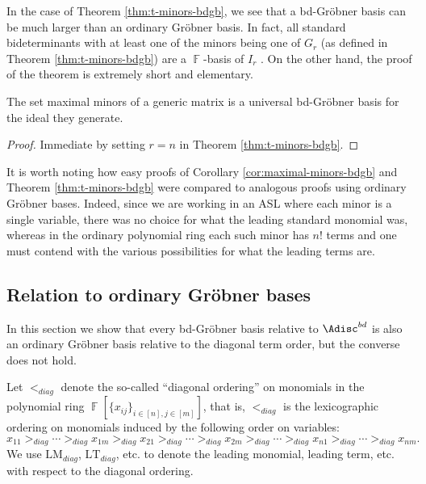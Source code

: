 \documentclass[11pt,reqno]{amsart}
\DeclareMathOperator{\F}{\mathbb{F}}
\newcommand{\gb}{Gr\"{o}bner }
\newcommand{\lt}{\text{LT}}
\newcommand{\lm}{\text{LM}}
\theoremstyle{definition}
\numberwithin{equation}{section}
\begin{document}
\begin{remark}
In the case of Theorem \ref{thm:t-minors-bdgb}, we see that a bd-\gb basis can be much larger than an ordinary \gb basis. In fact, all standard bideterminants with at least one of the minors being one of $G_{r}$ (as defined in Theorem \ref{thm:t-minors-bdgb}) are a $\F$-basis of $I_r$ \cite[Corollary 3.4.2]{bruns2022determinants}. On the other hand, the proof of the theorem is extremely short and elementary.
\end{remark}

\begin{corollary}[store=thmmaximalminorsbdgb,note={of Theorem \ref{thm:t-minors-bdgb}}]
\label{cor:maximal-minors-bdgb}
The set maximal minors of a generic matrix is a universal bd-Gröbner basis for the ideal they generate.
\end{corollary}

\begin{proof}
Immediate by setting $r = n$ in Theorem \ref{thm:t-minors-bdgb}.
\end{proof}

\begin{remark}
It is worth noting how easy proofs of Corollary \ref{cor:maximal-minors-bdgb} and Theorem \ref{thm:t-minors-bdgb} were compared to analogous proofs using ordinary Gröbner bases. Indeed, since we are working in an ASL where each minor is a single variable, there was no choice for what the leading standard monomial was, whereas in the ordinary polynomial ring each such minor has $n!$ terms and one must contend with the various possibilities for what the leading terms are. 
\end{remark}



\subsection{Relation to ordinary Gröbner bases} \label{sec:ordinary}
In this section we show that every bd-Gröbner basis relative to $\Adisc^{bd}$ is also an ordinary Gröbner basis relative to the diagonal term order, but the converse does not hold.

Let $<_{diag}$ denote the so-called ``diagonal ordering'' on monomials in the polynomial ring $\F[\{x_{ij}\}_{i \in [n], j \in [m]}]$, that is, $<_{diag}$ is the lexicographic ordering on monomials induced by the following order on variables: 
\[
x_{11} >_{diag} \dotsb >_{diag} x_{1m} >_{diag} x_{21} >_{diag} \dotsb >_{diag} x_{2m} >_{diag} \dotsb >_{diag} x_{n1} >_{diag} \dotsb >_{diag} x_{nm}.
\]
We use $\lm_{diag}$, $\lt_{diag}$, etc. to denote the leading monomial, leading term, etc. with respect to the diagonal ordering.
\end{document}
